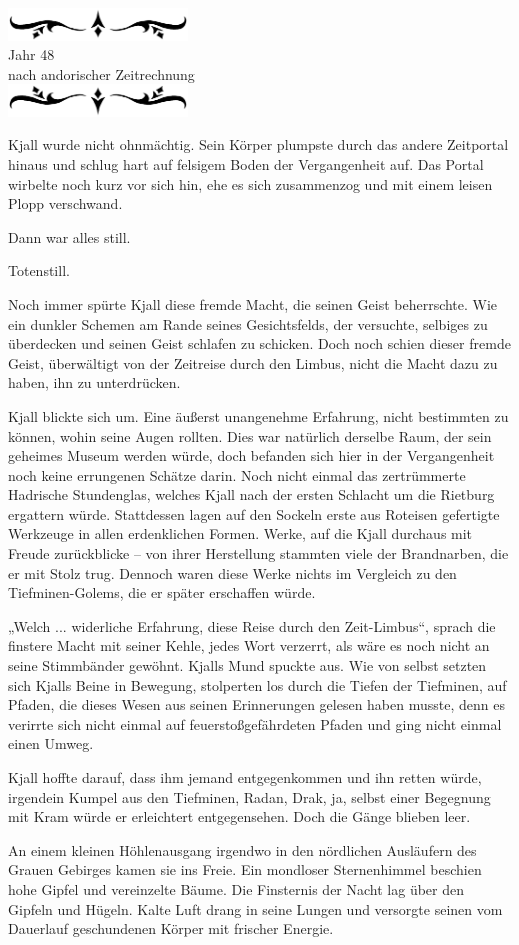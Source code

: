 \documentclass[10pt, a4paper, oneside]{book}
\newcommand{\az}[1]{%
    \begin{center}
        \includegraphics[width=180px]{Das Erbe des Wunderkindes/verzierung1.png}\\
        {\Huge #1} \\
        {nach andorischer Zeitrechnung}\\
        \includegraphics[width=180px]{Das Erbe des Wunderkindes/verzierung2.png}
    \end{center}
    \extramarks{}{#1 a.Z.}
}
\begin{document}
\az{Jahr 48}

Kjall wurde nicht ohnmächtig. Sein Körper plumpste durch das andere Zeitportal hinaus und schlug hart auf felsigem Boden der Vergangenheit auf. Das Portal wirbelte noch kurz vor sich hin, ehe es sich zusammenzog und mit einem leisen Plopp verschwand.

Dann war alles still.

Totenstill.

Noch immer spürte Kjall diese fremde Macht, die seinen Geist beherrschte. Wie ein dunkler Schemen am Rande seines Gesichtsfelds, der versuchte, selbiges zu überdecken und seinen Geist schlafen zu schicken. Doch noch schien dieser fremde Geist, überwältigt von der Zeitreise durch den Limbus, nicht die Macht dazu zu haben, ihn zu unterdrücken.

Kjall blickte sich um. Eine äußerst unangenehme Erfahrung, nicht bestimmten zu können, wohin seine Augen rollten. Dies war natürlich derselbe Raum, der sein geheimes Museum werden würde, doch befanden sich hier in der Vergangenheit noch keine errungenen Schätze darin. Noch nicht einmal das zertrümmerte Hadrische Stundenglas, welches Kjall nach der ersten Schlacht um die Rietburg ergattern würde. Stattdessen lagen auf den Sockeln erste aus Roteisen gefertigte Werkzeuge in allen erdenklichen Formen. Werke, auf die Kjall durchaus mit Freude zurückblicke – von ihrer Herstellung stammten viele der Brandnarben, die er mit Stolz trug. Dennoch waren diese Werke nichts im Vergleich zu den Tiefminen-Golems, die er später erschaffen würde.

„Welch ... widerliche Erfahrung, diese Reise durch den Zeit-Limbus“, sprach die finstere Macht mit seiner Kehle, jedes Wort verzerrt, als wäre es noch nicht an seine Stimmbänder gewöhnt. Kjalls Mund spuckte aus. Wie von selbst setzten sich Kjalls Beine in Bewegung, stolperten los durch die Tiefen der Tiefminen, auf Pfaden, die dieses Wesen aus seinen Erinnerungen gelesen haben musste, denn es verirrte sich nicht einmal auf feuerstoßgefährdeten Pfaden und ging nicht einmal einen Umweg.

Kjall hoffte darauf, dass ihm jemand entgegenkommen und ihn retten würde, irgendein Kumpel aus den Tiefminen, Radan, Drak, ja, selbst einer Begegnung mit Kram würde er erleichtert entgegensehen. Doch die Gänge blieben leer.

An einem kleinen Höhlenausgang irgendwo in den nördlichen Ausläufern des Grauen Gebirges kamen sie ins Freie. Ein mondloser Sternenhimmel beschien hohe Gipfel und vereinzelte Bäume. Die Finsternis der Nacht lag über den Gipfeln und Hügeln. Kalte Luft drang in seine Lungen und versorgte seinen vom Dauerlauf geschundenen Körper mit frischer Energie.
\end{document}
